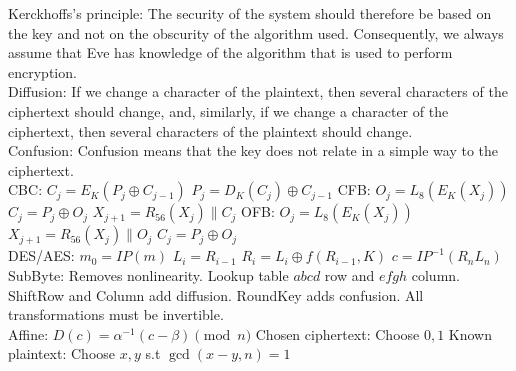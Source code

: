\documentclass[10pt]{article}
\begin{document}
Kerckhoffs’s principle: The security of the system should therefore be based on the key and not on the obscurity of the algorithm used. 
Consequently, we always assume that Eve has knowledge of the algorithm that is used to perform encryption.\\

Diffusion: If we change a character of the plaintext, then several characters of the ciphertext should change, 
and, similarly, if we change a character of the ciphertext, then several characters of the plaintext should change.\\

Confusion: Confusion means that the key does not relate in a simple way to the ciphertext.\\

CBC\@: $C_j=E_K(P_j\oplus C_{j-1})$ $P_j=D_K(C_j)\oplus C_{j-1}$ CFB\@: $O_j=L_8(E_K(X_j))$ $C_j=P_j\oplus O_j$ $X_{j+1}=R_{56}(X_j)\parallel C_j$ OFB\@: $O_j=L_8(E_K(X_j))$ $X_{j+1}=R_{56}(X_j)\parallel O_j$ $C_j=P_j\oplus O_j$ \\ 

DES/AES\@: $m_0=IP(m)$ $L_i=R_{i-1}$ $R_i=L_i\oplus f(R_{i-1},K)$ $c=IP^{-1}(R_n L_n)$ \\

SubByte: Removes nonlinearity. Lookup table $abcd$ row and $efgh$ column. ShiftRow and Column add diffusion. RoundKey adds confusion. All transformations must be invertible.\\

Affine: $D(c)=\alpha^{-1}(c-\beta)\pmod{n}$ Chosen ciphertext: Choose $0,1$ Known plaintext: Choose $x,y$ s.t $\gcd(x-y,n)=1$\\
\end{document}
